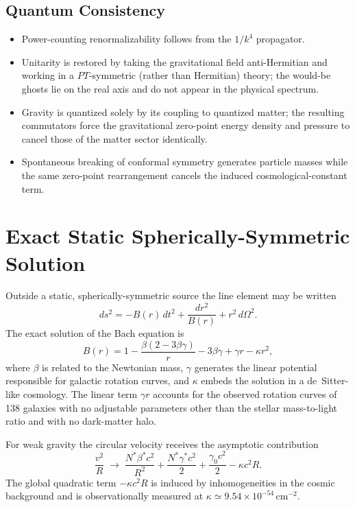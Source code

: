 \documentclass{article}
\begin{document}
\subsection{Quantum Consistency}

\begin{itemize}
\item Power-counting renormalizability follows from the \(1/k^4\) propagator.
\item Unitarity is restored by taking the gravitational field anti-Hermitian and working in a \(PT\)-symmetric (rather than Hermitian) theory; the would-be ghosts lie on the real axis and do not appear in the physical spectrum.
\item Gravity is quantized solely by its coupling to quantized matter; the resulting commutators force the gravitational zero-point energy density and pressure to cancel those of the matter sector identically.
\item Spontaneous breaking of conformal symmetry generates particle masses while the same zero-point rearrangement cancels the induced cosmological-constant term.
\end{itemize}

\section{Exact Static Spherically-Symmetric Solution}
\label{sec:exact}

Outside a static, spherically-symmetric source the line element may be written
\begin{equation}
ds^2=-B(r)\,dt^2+\frac{dr^2}{B(r)}+r^2\,d\Omega^2.
\end{equation}
The exact solution of the Bach equation is
\begin{equation}
B(r)=1-\frac{\beta(2-3\beta\gamma)}{r}-3\beta\gamma+\gamma r-\kappa r^2,
\end{equation}
where \(\beta\) is related to the Newtonian mass, \(\gamma\) generates the linear potential responsible for galactic rotation curves, and \(\kappa\) embeds the solution in a de~Sitter-like cosmology. The linear term \(\gamma r\) accounts for the observed rotation curves of 138 galaxies with no adjustable parameters other than the stellar mass-to-light ratio and with no dark-matter halo.

For weak gravity the circular velocity receives the asymptotic contribution
\begin{equation}
\frac{v^2}{R}\;\longrightarrow\;\frac{N^*\beta^*c^2}{R^2}+\frac{N^*\gamma^*c^2}{2}+\frac{\gamma_0 c^2}{2}-\kappa c^2 R.
\end{equation}
The global quadratic term \(-\kappa c^2 R\) is induced by inhomogeneities in the cosmic background and is observationally measured at \(\kappa\simeq9.54\times10^{-54}\,\mathrm{cm}^{-2}\).
\end{document}
